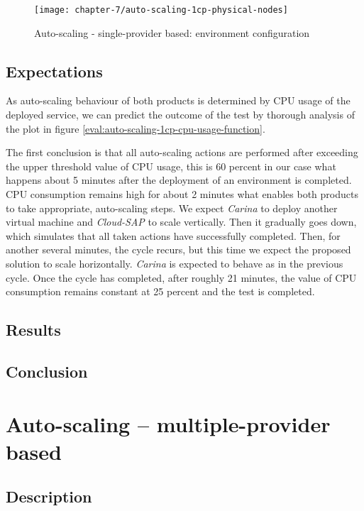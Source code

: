 \begin{figure}[!ht]
  \begin{center}
    \texttt{[image: chapter-7/auto-scaling-1cp-physical-nodes]}
  \end{center}
  \caption{Auto-scaling - single-provider based: environment configuration}
  \label{eval:auto-scaling-1cp-physical-nodes}
\end{figure}

\subsection*{Expectations}
As auto-scaling behaviour of both products is determined by CPU usage of the deployed service, we can predict the outcome of the test by thorough analysis of the plot in figure \ref{eval:auto-scaling-1cp-cpu-usage-function}.

The first conclusion is that all auto-scaling actions are performed after exceeding the upper threshold value of CPU usage, this is 60 percent in our case what happens about 5 minutes after the deployment of an environment is completed. CPU consumption remains high for about 2 minutes what enables both products to take appropriate, auto-scaling steps. We expect \emph{Carina} to deploy another virtual machine and \emph{Cloud-SAP} to scale vertically. Then it gradually goes down, which simulates that all taken actions have successfully completed. Then, for another several minutes, the cycle recurs, but this time we expect the proposed solution to scale horizontally. \emph{Carina} is expected to behave as in the previous cycle. Once the cycle has completed, after roughly 21 minutes, the value of CPU consumption remains constant at 25 percent and the test is completed.
  \subsection*{Results}
\subsection*{Conclusion}

\section{Auto-scaling -- multiple-provider based}
\subsection*{Description}
